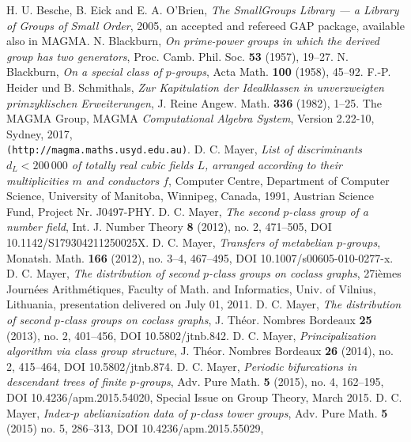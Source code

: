 \documentclass{amsart}
\theoremstyle{definition}
\numberwithin{equation}{section}
\begin{document}
\begin{thebibliography}{XX}
%
H. U. Besche, B. Eick and E. A. O'Brien,
\textit{The SmallGroups Library --- a Library of Groups of Small Order},
2005,
an accepted and refereed GAP package, available also in MAGMA.
%
N. Blackburn,
\textit{On prime-power groups in which the derived group has two generators},
Proc. Camb. Phil. Soc.
\textbf{53}
(1957),
19--27.
%
N. Blackburn,
\textit{On a special class of \(p\)-groups},
Acta Math.
\textbf{100}
(1958),
45--92.
%
F.-P. Heider und B. Schmithals,
\textit{Zur Kapitulation der Idealklassen in unverzweigten primzyklischen Erweiterungen},
J. Reine Angew. Math.
\textbf{336}
(1982),
1--25.
%
The MAGMA Group,
MAGMA \textit{Computational Algebra System},
Version 2.22-10,
Sydney,
2017, \\
\verb+(http://magma.maths.usyd.edu.au)+.
%
D. C. Mayer,
\textit{List of discriminants \(d_L<200\,000\) of totally real cubic fields \(L\),
arranged according to their multiplicities \(m\) and conductors \(f\)},
Computer Centre, Department of Computer Science, University of Manitoba, Winnipeg, Canada,
1991, Austrian Science Fund, Project Nr. J0497-PHY.
%
D. C. Mayer,
\textit{The second \(p\)-class group of a number field},
Int. J. Number Theory
\textbf{8}
(2012),
no. 2,
471--505,
DOI 10.1142/S179304211250025X.
%
D. C. Mayer,
\textit{Transfers of metabelian \(p\)-groups},
Monatsh. Math.
\textbf{166}
(2012),
no. 3--4,
467--495,
DOI 10.1007/s00605-010-0277-x.
%
D. C. Mayer,
\textit{The distribution of second \(p\)-class groups on coclass graphs},
27i\`emes Journ\'ees Arithm\'etiques,
Faculty of Math. and Informatics,
Univ. of Vilnius,
Lithuania,
presentation delivered on July 01, 2011.
%
D. C. Mayer,
\textit{The distribution of second \(p\)-class groups on coclass graphs},
J. Th\'eor. Nombres Bordeaux
\textbf{25}
(2013),
no. 2,
401--456,
DOI 10.5802/jtnb.842.
%
D. C. Mayer,
\textit{Principalization algorithm via class group structure},
J. Th\'eor. Nombres Bordeaux
\textbf{26}
(2014),
no. 2,
415--464,
DOI 10.5802/jtnb.874.
%
D. C. Mayer,
\textit{Periodic bifurcations in descendant trees of finite \(p\)-groups},
Adv. Pure Math.
\textbf{5}
(2015),
no. 4,
162--195,
DOI 10.4236/apm.2015.54020,
Special Issue on Group Theory,
March 2015.
%
D. C. Mayer,
\textit{Index-\(p\) abelianization data of \(p\)-class tower groups},
Adv. Pure Math.
\textbf{5}
(2015)
no. 5,
286--313,
DOI 10.4236/apm.2015.55029,

\end{thebibliography}
\end{document}
